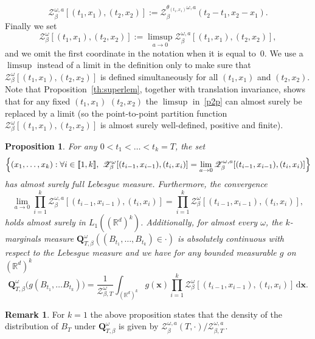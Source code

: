 \documentclass[10pt]{amsart}
\let\mathcal\mathscr
\let\sep:
\newcommand{\lint}{\mathopen{[\![}}
\newcommand{\rint}{\mathclose{]\!]}}
\newtheorem{proposition}[theorem]{Proposition}
\theoremstyle{definition}
\newtheorem{rem}[theorem]{Remark}
\newcommand{\bx}{\boldsymbol{x}}
\newcommand{\dd}{\mathrm{d}}
\newcommand{\cZ}{{\ensuremath{\mathcal Z}} }
\newcommand{\bQ}{{\ensuremath{\mathbf Q}} }
\newcommand{\bbR}{{\ensuremath{\mathbb R}} }
\let\gb\beta
\let\go\omega
\begin{document}
\begin{equation}
\cZ^{\go,a}_{\beta}[(t_1,x_1),(t_2,x_2)]:= \cZ^{\theta_{(t_1,x_1)}\go,a}_{\beta}(t_2-t_1, x_2-x_1).
\end{equation}
Finally we set
\begin{equation}
\label{p2p}
\cZ^{\go}_{\beta}[(t_1,x_1),(t_2,x_2)]:= \limsup_{a\to 0} \cZ^{\go,a}_{\beta}[(t_1,x_1),(t_2,x_2)],
\end{equation}
and we omit the first coordinate in the notation when it is equal to~$0$.
We use a $\limsup$ instead of a limit in the definition only to make sure that $\cZ^{\go}_{\beta}[(t_1,x_1),(t_2,x_2)]$ is defined simultaneously for all $(t_1,x_1)$ and $(t_2,x_2)$.
Note that Proposition~\ref{th:superlem}, togeth\-er with translation invariance, shows that
for any fixed $(t_1,x_1)$ $(t_2,x_2)$
the $\limsup$ in~\eqref{p2p} can almost surely be replaced by a limit (so the point-to-point partition function
$\cZ_{\gb}^{\go}[(t_1,x_1),(t_2,x_2)]$
is almost surely well-defined, positive and finite).

\begin{proposition}
\label{twomarg}
For any $0<t_1<\dots<t_k=T$,
the set
\[
\Bigl\{ (x_1, \ldots, x_k) \sep \forall i\in \lint 1,k\rint,\ \cZ^{\go}_{\beta}[(t_{i-1},x_{i-1}),(t_i,x_{i})] = \lim_{a\to 0} \cZ^{\go,a}_{\beta}[(t_{i-1},x_{i-1}),(t_i,x_{i})] \Bigr\}
\]
has almost surely full Lebesgue measure.
Furthermore, the convergence
\begin{equation}
\lim_{a\to 0}\prod_{i=1}^k \cZ^{\go,a}_{\beta}[(t_{i-1},x_{i-1}),(t_i,x_{i})]=\prod_{i=1}^k \cZ^{\go}_{\beta}[(t_{i-1},x_{i-1}),(t_i,x_{i})],
\end{equation}
holds almost surely in $L_1((\bbR^{d})^{k})$.
Additionally, for almost every $\go$, the $k$-marginals measure $\bQ^{\go}_{T,\beta}((B_{t_1},\dots, B_{t_k})\in \cdot)$ is absolutely continuous with respect to the Lebesgue measure
and we have for any bounded measurable $g$ on $(\bbR^{d})^{k}$
\begin{equation}
\bQ^{\go}_{T,\beta} \bigl(g(B_{t_1},\dots B_{t_k}) \bigr)= \frac{1 }{\mathcal Z^{\go}_{\beta,T}} \int_{(\bbR^d)^k} g(\bx)\prod_{i=1}^k \cZ^{\go}_{\beta}[(t_{i-1},x_{i-1}),(t_i,x_{i})] \,\dd \bx.
\end{equation}
\end{proposition}

\begin{rem}
For $k=1$ the above proposition states that the density of the distribution of $B_T$ under $\bQ_{T,\gb}^{\go}$ is given by $\cZ^{\go,a}_{\beta}(T,\cdot)/\cZ^{\go,a}_{\beta,T}\,$.
\end{rem}
\end{document}
